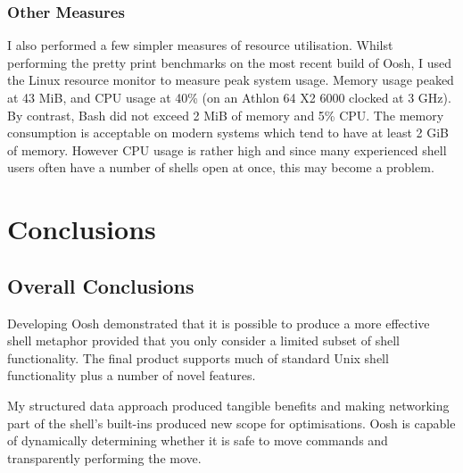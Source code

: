\documentclass[12pt,twoside,notitlepage]{report}
\begin{document}
\subsection{Other Measures}
\label{othermeasures}

I also performed a few simpler measures of resource
utilisation. Whilst performing the pretty print benchmarks on the most
recent build of Oosh, I used the Linux resource monitor to measure
peak system usage. Memory usage peaked at 43 MiB, and CPU usage at 40\%
(on an Athlon 64 X2 6000 clocked at 3 GHz). By contrast, Bash did not
exceed 2 MiB of memory and 5\% CPU. The memory consumption is
acceptable on modern systems which tend to have at least 2 GiB of
memory. However CPU usage is rather high and since many experienced
shell users often have a number of shells open at once, this may
become a problem.


\cleardoublepage
\chapter{Conclusions}


\section{Overall Conclusions}

Developing Oosh demonstrated that it is possible to produce a more
effective shell metaphor provided that you only consider a limited
subset of shell functionality. The final product supports much of
standard Unix shell functionality plus a number of novel features. 

My structured data approach produced tangible benefits and making
networking part of the shell's built-ins produced new scope for
optimisations. Oosh is capable of dynamically determining whether it
is safe to move commands and transparently performing the move.
\end{document}
